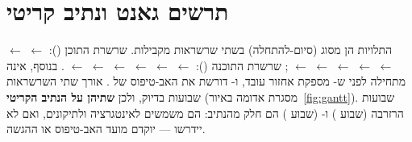 \section{תרשים גאנט ונתיב קריטי}
התלויות הן מסוג  (סיום-להתחלה) בשתי שרשראות מקבילות. שרשרת התוכן (\StudentTwo):
 $\leftarrow$  $\leftarrow$  $\leftarrow$  $\leftarrow$  $\leftarrow$
 $\leftarrow$  $\leftarrow$ ; שרשרת התוכנה (\StudentOne):  $\leftarrow$
 $\leftarrow$  $\leftarrow$  $\leftarrow$  $\leftarrow$  $\leftarrow$
. בנוסף,  אינה מתחילה לפני ש- מספקת אחזור עובד, ו- דורשת את האב-טיפוס של
. אורך שתי השרשראות  שבועות בדיוק, ולכן \textbf{שתיהן על הנתיב הקריטי} (מסגרת אדומה באיור~\ref{fig:gantt}).
שבועות הרזרבה  (שבוע ) ו- (שבוע ) הם חלק מהנתיב: הם משמשים לאינטגרציה ולתיקונים,
ואם לא יידרשו --- יוקדם מועד האב-טיפוס או ההגשה.

